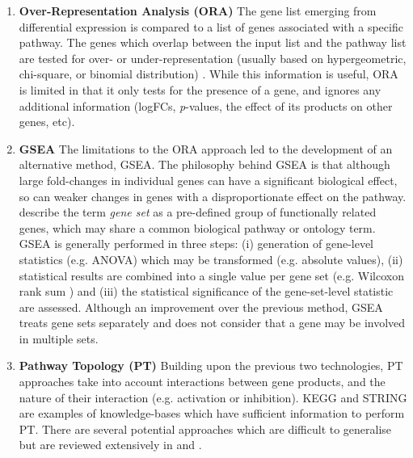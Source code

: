 \begin{enumerate}
\item[] \textbf{Over-Representation Analysis (ORA)} \hspace{0.15cm} The gene list emerging from differential expression is compared to a list of genes associated with a specific pathway. The genes which overlap between the input list and the pathway list are tested for over- or under-representation (usually based on hypergeometric, chi-square, or binomial distribution) \citep{khatri2012ten}. While this information is useful, ORA is limited in that it only tests for the presence of a gene, and ignores any additional information (\ac{logFC}s, \textit{p}-values, the effect of its products on other genes, etc).

\item[] \textbf{\ac{GSEA}} \hspace{0.15cm} The limitations to the ORA approach led to the development of an alternative method, GSEA. The philosophy behind GSEA is that although large fold-changes in individual genes can have a significant biological effect, so can weaker changes in genes with a disproportionate effect on the pathway. \cite{luo2009gage} describe the term \textit{gene set} as a pre-defined group of functionally related genes, which may share a common biological pathway or ontology term. \ac{GSEA} is generally performed in three steps: (i) generation of gene-level statistics (e.g. ANOVA) which may be transformed (e.g. absolute values), (ii) statistical results are combined into a single value per gene set (e.g. Wilcoxon rank sum \citep{barry2005significance}) and (iii) the statistical significance of the gene-set-level statistic are assessed. Although an improvement over the previous method, GSEA treats gene sets separately and does not consider that a gene may be involved in multiple sets.

\item[] \textbf{Pathway Topology (PT)} \hspace{0.15cm} Building upon the previous two technologies, PT approaches take into account interactions between gene products, and the nature of their interaction (e.g. activation or inhibition). KEGG and STRING \citep{szklarczyk2016string} are examples of knowledge-bases which have sufficient information to perform PT. There are several potential approaches which are difficult to generalise but are reviewed extensively in \cite{ihnatova2018critical} and \cite{ma2019comparative}.

\end{enumerate} 

